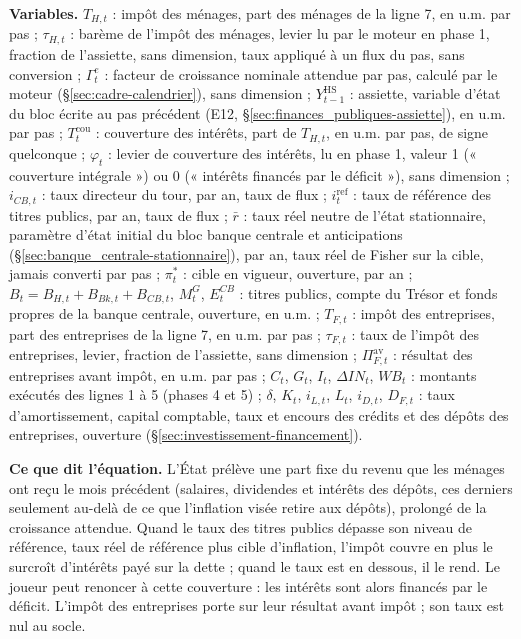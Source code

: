 \documentclass[11pt,a4paper]{article}
\newcommand{\variables}{\par\noindent\textbf{Variables.} }
\newcommand{\sens}{\par\noindent\textbf{Ce que dit l'équation.} }
\begin{document}
\begin{proposee}
\variables $T_{H,t}$ : impôt des ménages, part des ménages de la ligne 7, en u.m. par pas ; $\tau_{H,t}$ : barème de l'impôt des ménages, levier lu par le moteur en phase 1, fraction de l'assiette, sans dimension, taux appliqué à un flux du pas, sans conversion ; $\Gamma^e_t$ : facteur de croissance nominale attendue par pas, calculé par le moteur (\S\ref{sec:cadre-calendrier}), sans dimension ; $Y^{\mathrm{HS}}_{t-1}$ : assiette, variable d'état du bloc écrite au pas précédent (E12, \S\ref{sec:finances_publiques-assiette}), en u.m. par pas ; $T^{\mathrm{cou}}_t$ : couverture des intérêts, part de $T_{H,t}$, en u.m. par pas, de signe quelconque ; $\varphi_t$ : levier de couverture des intérêts, lu en phase 1, valeur 1 (« couverture intégrale ») ou 0 (« intérêts financés par le déficit »), sans dimension ; $i_{\mathit{CB},t}$ : taux directeur du tour, par an, taux de flux ; $i^{\mathrm{ref}}_t$ : taux de référence des titres publics, par an, taux de flux ; $\bar r$ : taux réel neutre de l'état stationnaire, paramètre d'état initial du bloc banque centrale et anticipations (\S\ref{sec:banque_centrale-stationnaire}), par an, taux réel de Fisher sur la cible, jamais converti par pas ; $\pi^\ast_t$ : cible en vigueur, ouverture, par an ; $B_t = B_{H,t} + B_{\mathit{Bk},t} + B_{\mathit{CB},t}$, $M^G_t$, $E^{\mathit{CB}}_t$ : titres publics, compte du Trésor et fonds propres de la banque centrale, ouverture, en u.m. ; $T_{F,t}$ : impôt des entreprises, part des entreprises de la ligne 7, en u.m. par pas ; $\tau_{F,t}$ : taux de l'impôt des entreprises, levier, fraction de l'assiette, sans dimension ; $\Pi^{\mathrm{av}}_{F,t}$ : résultat des entreprises avant impôt, en u.m. par pas ; $C_t$, $G_t$, $I_t$, $\Delta\mathit{IN}_t$, $\mathit{WB}_t$ : montants exécutés des lignes 1 à 5 (phases 4 et 5) ; $\delta$, $K_t$, $i_{L,t}$, $L_t$, $i_{D,t}$, $D_{F,t}$ : taux d'amortissement, capital comptable, taux et encours des crédits et des dépôts des entreprises, ouverture (\S\ref{sec:investissement-financement}).
\sens L'État prélève une part fixe du revenu que les ménages ont reçu le mois précédent (salaires, dividendes et intérêts des dépôts, ces derniers seulement au-delà de ce que l'inflation visée retire aux dépôts), prolongé de la croissance attendue. Quand le taux des titres publics dépasse son niveau de référence, taux réel de référence plus cible d'inflation, l'impôt couvre en plus le surcroît d'intérêts payé sur la dette ; quand le taux est en dessous, il le rend. Le joueur peut renoncer à cette couverture : les intérêts sont alors financés par le déficit. L'impôt des entreprises porte sur leur résultat avant impôt ; son taux est nul au socle.

\end{proposee}
\end{document}
